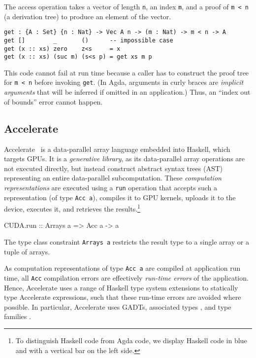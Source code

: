 \documentclass{llncs}
\begin{document}
The access operation takes a vector of length \verb+n+, an index
\verb+m+, and a proof of \verb+m < n+ (a derivation tree) to produce
an element of the vector.  
\begin{verbatim}
get : {A : Set} {n : Nat} -> Vec A n -> (m : Nat) -> m < n -> A
get []        _       ()      -- impossible case
get (x :: xs) zero    z<s     = x
get (x :: xs) (suc m) (s<s p) = get xs m p
\end{verbatim}
This code cannot fail at run time because a caller has to
construct the proof tree for \verb+m < n+ before invoking
\verb+get+. (In Agda, arguments in curly braces are \emph{implicit
  arguments} that will be inferred if omitted in an application.)
Thus, an ``index out of bounds'' error cannot happen.

\subsection{Accelerate}
\label{sec:accelerate}

Accelerate~\cite{ChakravartyKellerLeeMcdonellGrover2011} is a
data-parallel array language embedded into Haskell, which targets
GPUs. It is a \emph{generative library}, as its data-parallel array
operations are not executed directly, but instead construct abstract
syntax trees (AST) representing an entire data-parallel
subcomputation. These \emph{computation representations} are executed
using a \verb+run+ operation that accepts such a representation (of type
\verb+Acc a+), compiles it to GPU kernels, uploads it to the device,
executes it, and retrieves the results.\footnote{To distinguish
  Haskell code from Agda code, we display Haskell code in blue and with
  a vertical bar on the left side.}
%
\begin{hcode}
CUDA.run :: Arrays a => Acc a -> a
\end{hcode}
%
The type class constraint \verb+Arrays a+ restricts the result type to a single array or a tuple of arrays.

As computation representations of type \verb+Acc a+ are compiled at
application run time, all \verb+Acc+ compilation errors are effectively \emph{run-time errors} of the application. Hence, Accelerate uses a range of Haskell type system extensions to statically type Accelerate expressions, such that these run-time errors are avoided where possible. In particular, Accelerate uses GADTs\cite{PeytonJonesVytiniotisWeirichWashburn2006}, associated types
\cite{ChakravartyKellerJones2005}, and type families
\cite{SchrijversPeytonJonesChakravartySulzmann2008}. 
\end{document}
